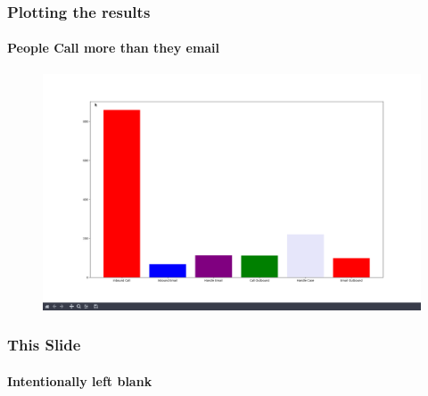 \documentclass{beamer}
\begin{document}
    \begin{frame}[t]
        \frametitle{Plotting the results}
        \framesubtitle{People Call more than they email}
        \begin{figure}[!h]
            \centering
            \includegraphics[width=1.0\linewidth]{images3/plot.png}
        \end{figure}
    \end{frame}

    \begin{frame}[t]
        \frametitle{This Slide}
        \framesubtitle{Intentionally left blank}
    \end{frame}
\end{document}

